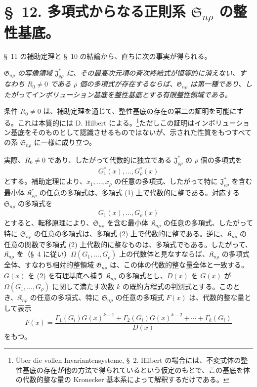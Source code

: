 \documentclass[11pt]{jlreq}
\providecommand{\Kfield}{\mathfrak{K}}
\providecommand{\Ssys}{\mathfrak{S}}
\providecommand{\Jdom}{\mathfrak{J}}
\providecommand{\Gdom}{\mathfrak{G}}
\begin{document}
\section*{\S\ 12. 多項式からなる正則系 $\Ssys_{n\rho}$ の整性基底。}

\S\ 11 の補助定理と \S\ 10 の結論から、直ちに次の事実が得られる。

\emph{$\Gdom_{n\rho}$ の写像領域 $\Jdom^*_{\rho\rho}$ に、その最高次元項の斉次終結式が恒等的に消えない、すなわち $R_0\ne0$ である $\rho$ 個の多項式が存在するならば、$\Gdom_{n\rho}$ は第一種であり、したがってインボリューション基底を整性基底とする有限整性領域である。}

条件 $R_0\ne0$ は、補助定理を通じて、整性基底の存在の第二の証明を可能にする。これは本質的には D. Hilbert による。\footnote{Über die vollen Invariantensysteme, \S\ 2. Hilbert の場合には、不変式体の整性基底の存在が他の方法で得られているという仮定のもとで、この基底を体の代数的整な量の Kronecker 基本系によって解釈するだけである。}ただしこの証明はインボリューション基底をそのものとして認識させるものではないが、示された性質をもつすべての系 $\Ssys_{n\rho}$ に一様に成り立つ。

実際、$R_0\ne0$ であり、したがって代数的に独立である $\Jdom^*_{\rho\rho}$ の $\rho$ 個の多項式を
\begin{equation}
  G_1^*(x),\ldots,G_\rho^*(x)
\tag{1}
\end{equation}
とする。補助定理により、$x_1,\ldots,x_\rho$ の任意の多項式、したがって特に $\Jdom^*_{\rho\rho}$ を含む最小体 $\Kfield^*_{\rho\rho}$ の任意の多項式は、多項式 (1) 上で代数的に整である。対応する $\Ssys_{n\rho}$ の多項式を
\begin{equation}
  G_1(x),\ldots,G_\rho(x)
\tag{2}
\end{equation}
とすると、転移原理により、$\Ssys_{n\rho}$ を含む最小体 $\Kfield_{n\rho}$ の任意の多項式、したがって特に $\Ssys_{n\rho}$ の任意の多項式は、多項式 (2) 上で代数的に整である。逆に、$\Kfield_{n\rho}$ の任意の関数で多項式 (2) 上代数的に整なものは、多項式でもある。したがって、$\Kfield_{n\rho}$ を（\S\ 4 に従い）$\Omega(G_1,\ldots,G_\rho)$ 上の代数体と見なすならば、$\Kfield_{n\rho}$ の多項式全体、すなわち相対的整領域 $\Gdom_{n\rho}$ は、この体の代数的整な量全体と一致する。$G(x)$ を (2) を有理基底へ補う $\Kfield_{n\rho}$ の多項式とし、$D(x)$ を $G(x)$ が $\Omega(G_1,\ldots,G_\rho)$ に関して満たす次数 $k$ の既約方程式の判別式とする。このとき、$\Kfield_{n\rho}$ の任意の多項式、特に $\Ssys_{n\rho}$ の任意の多項式 $F(x)$ は、代数的整な量として表示
\begin{equation}
  F(x)=\frac{\Gamma_1(G_i)G(x)^{k-1}+\Gamma_2(G_i)G(x)^{k-2}+\cdots+\Gamma_k(G_i)}{D(x)}
\tag{3}
\end{equation}
をもつ。
\end{document}
